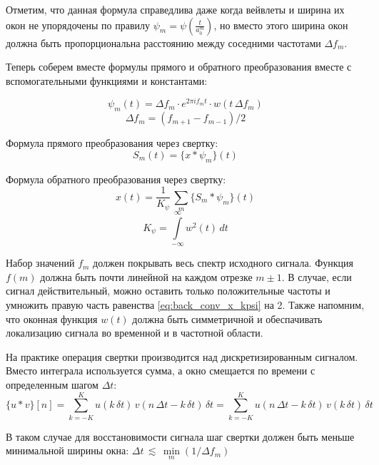 Отметим, что данная формула справедлива даже когда вейвлеты и ширина их окон не упорядочены по правилу $\psi_m = \psi(\frac{t}{a_0^m})$, 
но вместо этого ширина окон должна быть пропорциональна расстоянию между соседними частотами $\Delta f_m$.

Теперь соберем вместе формулы прямого и обратного преобразования вместе с вспомогательными функциями и константами:

\begin{equation}
  \psi_m(t) = \Delta f_m \cdot e^{2\pi i f_m t} \cdot w(t\,\Delta f_m)
\end{equation}
\begin{equation}
  \Delta f_m = (f_{m+1} - f_{m-1}) / 2
\end{equation}

Формула прямого преобразования через свертку:
\begin{equation}
  S_m(t) = \{x * \psi_m\}(t)
\end{equation}

Формула обратного преобразования через свертку:
\begin{equation}
  x(t) = \frac{1}{K_{\psi}} \, \sum \limits_m \{S_m * \psi_m\}(t)
  \label{eq:back_conv_x_kpsi}
\end{equation}
\begin{equation}
  K_{\psi} = \int \limits_{-\infty}^\infty w^2(t) \, dt
\end{equation}

Набор значений $f_m$ должен покрывать весь спектр исходного сигнала. Функция $f(m)$ должна быть почти линейной на каждом отрезке $m \pm 1$.
В случае, если сигнал действительный, можно оставить только положительные частоты и умножить правую часть равенства \ref{eq:back_conv_x_kpsi} на 2.
Также напомним, что оконная функция $w(t)$ должна быть симметричной и обеспачивать локализацию сигнала во временной и в частотной области.

На практике операция свертки производится над дискретизированным сигналом. Вместо интеграла используется сумма, 
а окно смещается по времени с определенным шагом $\Delta t$:
\begin{equation}
  \{u*v\}[n] = 
  \sum \limits_{ k = -K }^{ K } u( k\,\delta t ) \, v( n\,\Delta t - k\,\delta t ) \, \delta t = 
  \sum \limits_{ k = -K }^{ K } u( n\,\Delta t - k\,\delta t ) \, v( k\,\delta t ) \, \delta t
\end{equation}

В таком случае для восстановимости сигнала шаг свертки должен быть меньше минимальной ширины окна: 
$ \Delta t \, \lesssim \, \min \limits_m (1/\Delta f_m) $


